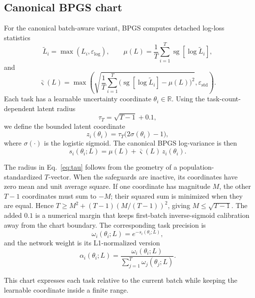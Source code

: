 \subsection{Canonical BPGS chart}
For the canonical batch-aware variant, BPGS computes detached log-loss statistics
\begin{equation}
\widetilde L_i = \max(L_i, \varepsilon_{\log}), \qquad
\mu(L) = \frac{1}{T}\sum_{i=1}^{T}\operatorname{sg}[\log \widetilde L_i],
\end{equation}
and
\begin{equation}
\bar{\varsigma}(L) =
\max\!\left(
\sqrt{\frac{1}{T}\sum_{i=1}^{T}\bigl(\operatorname{sg}[\log \widetilde L_i] - \mu(L)\bigr)^2},
\varepsilon_{\mathrm{std}}
\right).
\end{equation}
Each task has a learnable uncertainty coordinate $\theta_i \in \mathbb{R}$. Using the task-count-dependent latent radius
\begin{equation}
\tau_T = \sqrt{T-1}+0.1,
\label{eq:tau}
\end{equation}
we define the bounded latent coordinate
\begin{equation}
z_i(\theta_i) = \tau_T \bigl(2\sigma(\theta_i)-1\bigr),
\end{equation}
where $\sigma(\cdot)$ is the logistic sigmoid. The canonical BPGS log-variance is then
\begin{equation}
s_i(\theta_i;L) = \mu(L) + \bar{\varsigma}(L)\, z_i(\theta_i).
\end{equation}

The radius in Eq.~\eqref{eq:tau} follows from the geometry of a population-standardized
$T$-vector. When the safeguards are inactive, its coordinates have zero mean and unit average
square. If one coordinate has magnitude $M$, the other $T-1$ coordinates must sum to $-M$;
their squared sum is minimized when they are equal. Hence
$T \ge M^2+(T-1)(M/(T-1))^2$, giving $M\le\sqrt{T-1}$. The added $0.1$ is a numerical margin
that keeps first-batch inverse-sigmoid calibration away from the chart boundary.
The corresponding task precision is
\begin{equation}
\omega_i(\theta_i;L) = e^{-s_i(\theta_i;L)},
\end{equation}
and the network weight is its L1-normalized version
\begin{equation}
\alpha_i(\theta_i;L) =
\frac{\omega_i(\theta_i;L)}{\sum_{j=1}^{T}\omega_j(\theta_j;L)}.
\end{equation}

This chart expresses each task relative to the current batch while keeping the learnable coordinate
inside a finite range.

